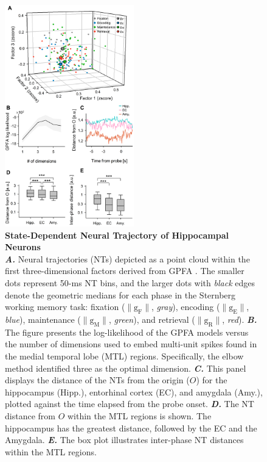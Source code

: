 \documentclass[preprint,review,12pt]{elsarticle}%
\begin{document}
        \clearpage
        \begin{figure}[ht]
        	\centering
            \includegraphics[width=0.5\textwidth]{./src/figures/.png/Figure_ID_02.png}
        	\caption{\textbf{
State-Dependent Neural Trajectory of Hippocampal Neurons
}
\smallskip
\\
\textbf{\textit{A.}} Neural trajectories (NTs) depicted as a point cloud within the first three-dimensional factors derived from GPFA \cite{yu_gaussian-process_2009}. The smaller dots represent 50-ms NT bins, and the larger dots with \textit{black} edges denote the geometric medians for each phase in the Sternberg working memory task: fixation ($\mathrm{\lVert g_{F} \rVert}$, \textit{gray}), encoding ($\mathrm{\lVert g_{E} \rVert}$, \textit{blue}), maintenance ($\mathrm{\lVert g_{M} \rVert}$, \textit{green}), and retrieval ($\mathrm{\lVert g_{R} \rVert}$, \textit{red}). \textbf{\textit{B.}} The figure presents the log-likelihood of the GPFA models versus the number of dimensions used to embed multi-unit spikes found in the medial temporal lobe (MTL) regions. Specifically, the elbow method identified three as the optimal dimension. \textbf{\textit{C.}} This panel displays the distance of the NTs from the origin ($O$) for the hippocampus (Hipp.), entorhinal cortex (EC), and amygdala (Amy.), plotted against the time elapsed from the probe onset. \textbf{\textit{D.}} The NT distance from $O$ within the MTL regions is shown. The hippocampus has the greatest distance, followed by the EC and the Amygdala. \textbf{\textit{E.}} The box plot illustrates inter-phase NT distances within the MTL regions.
}
        	\label{fig:02}
        \end{figure}
\end{document}
